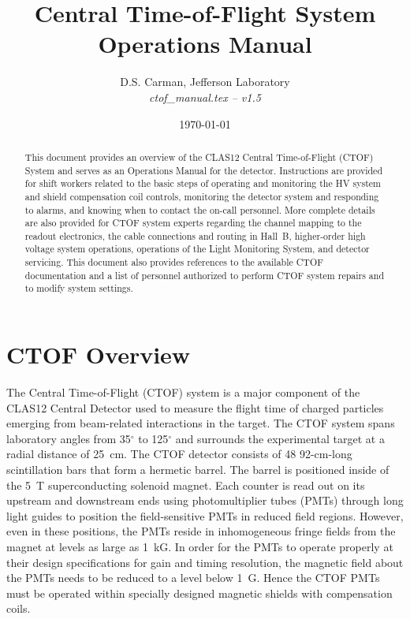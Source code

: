 \documentclass[12pt]{article}
\begin{document}
\title{Central Time-of-Flight System Operations Manual}

\vskip 0.5cm

\author{D.S. Carman, Jefferson Laboratory\\[0.2ex]
{\it ctof\_manual.tex -- v1.5}}

\date \today
%
\maketitle

\begin{abstract}
This document provides an overview of the CLAS12 Central Time-of-Flight (CTOF) 
System and serves as an Operations Manual for the detector. Instructions are 
provided for shift workers related to the basic steps of operating and monitoring 
the HV system and shield compensation coil controls, monitoring the detector 
system and responding to alarms, and knowing when to contact the on-call personnel. 
More complete details are also provided for CTOF system experts regarding the 
channel mapping to the readout electronics, the cable connections and routing in 
Hall~B, higher-order high voltage system operations, operations of the Light 
Monitoring System, and detector servicing. This document also provides references 
to the available CTOF documentation and a list of personnel authorized to perform 
CTOF system repairs and to modify system settings.
\end{abstract}

\thispagestyle{empty}

\clearpage

\vfil
\eject

\tableofcontents

\vfil
\eject

\section{CTOF Overview}
\label{intro}

The Central Time-of-Flight (CTOF) system is a major component of the CLAS12 
Central Detector used to measure the flight time of charged particles emerging 
from beam-related interactions in the target. The CTOF system spans laboratory 
angles from 35$^\circ$ to 125$^\circ$ and surrounds the experimental target at a 
radial distance of 25~cm. The CTOF detector consists of 48 92-cm-long scintillation 
bars that form a hermetic barrel. The barrel is positioned inside of the 5~T 
superconducting solenoid magnet. Each counter is read out on its upstream and
downstream ends using photomultiplier tubes (PMTs) through long light guides to 
position the field-sensitive PMTs in reduced field regions. However, even in these 
positions, the PMTs reside in inhomogeneous fringe fields from the magnet at levels 
as large as 1~kG. In order for the PMTs to operate properly at their design 
specifications for gain and timing resolution, the magnetic field about the PMTs 
needs to be reduced to a level below 1~G. Hence the CTOF PMTs must be operated 
within specially designed magnetic shields with compensation coils.
\end{document}
